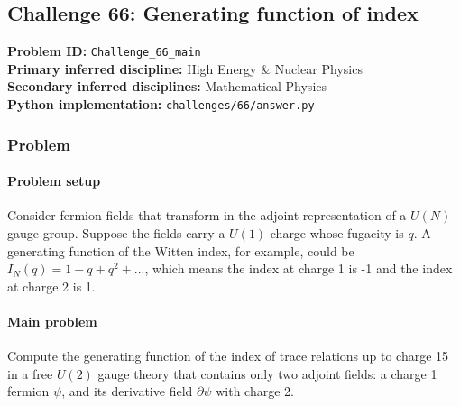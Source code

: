 \subsection[Challenge 66: Generating function of index]{Challenge 66: Generating function of index}
\textbf{Problem ID:} \texttt{Challenge\_66\_main}\\
\textbf{Primary inferred discipline:} High Energy \& Nuclear Physics\\
\textbf{Secondary inferred disciplines:} Mathematical Physics\\
\textbf{Python implementation:} \texttt{challenges/66/answer.py}

\subsubsection*{Problem}
\paragraph*{Problem setup}
Consider fermion fields that transform in the adjoint representation of a $U(N)$ gauge group. Suppose the fields carry a $U(1)$ charge whose fugacity is $q$. A generating function of the Witten index, for example, could be $I_N(q)=1-q+q^2+...$, which means the index at charge 1 is -1 and the index at charge 2 is 1.

\paragraph*{Main problem}
Compute the generating function of the index of trace relations up to charge 15 in a free $U(2)$ gauge theory that contains only two adjoint fields: a charge 1 fermion $\psi$, and its derivative field $\partial\psi$ with charge 2.
